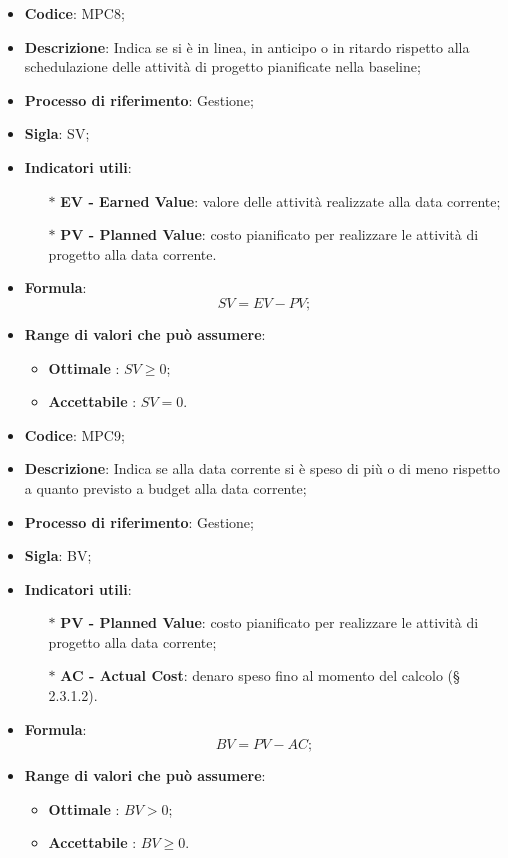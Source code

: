 \vspace{-1cm}
\begin{itemize}
	\item \textbf{Codice}: MPC8;
	\item \textbf{Descrizione}: Indica se si è in linea, in anticipo o in ritardo rispetto alla schedulazione delle attività di progetto pianificate nella baseline;
	\item \textbf{Processo di riferimento}: Gestione;
	\item \textbf{Sigla}: SV;
	\item \textbf{Indicatori utili}: 
		\begin{itemize}
		\item[$\ast$] \textbf{EV - Earned Value}: valore delle attività realizzate alla data corrente;
		\item[$\ast$] \textbf{PV - Planned Value}: costo pianificato per realizzare le attività di progetto alla data corrente.
		\end{itemize}
	\item \textbf{Formula}: \[ SV = EV - PV; \]
	\item \textbf{Range di valori che può assumere}: 
		\begin{itemize}
			\item \textbf{Ottimale} : $SV \geq 0$;
			\item \textbf{Accettabile} : $SV = 0$.
		\end{itemize}
\end{itemize}
\vspace{-1cm}
\begin{itemize}
	\item \textbf{Codice}: MPC9;
	\item \textbf{Descrizione}: Indica se alla data corrente si è speso di più o di meno rispetto a quanto previsto a budget alla data corrente;
	\item \textbf{Processo di riferimento}: Gestione;
	\item \textbf{Sigla}: BV;
	\item \textbf{Indicatori utili}: 
		\begin{itemize}
			\item[$\ast$] \textbf{PV - Planned Value}: costo pianificato per realizzare le attività di progetto alla data corrente;
			\item[$\ast$] \textbf{AC - Actual Cost}: denaro speso fino al momento del calcolo (§ 2.3.1.2).
		\end{itemize}
	\item \textbf{Formula}: \[ BV = PV - AC;\]
	\item \textbf{Range di valori che può assumere}: 
		\begin{itemize}
			\item \textbf{Ottimale} : $BV > 0$;
			\item \textbf{Accettabile} : $BV \geq 0$.
		\end{itemize}
\end{itemize}

